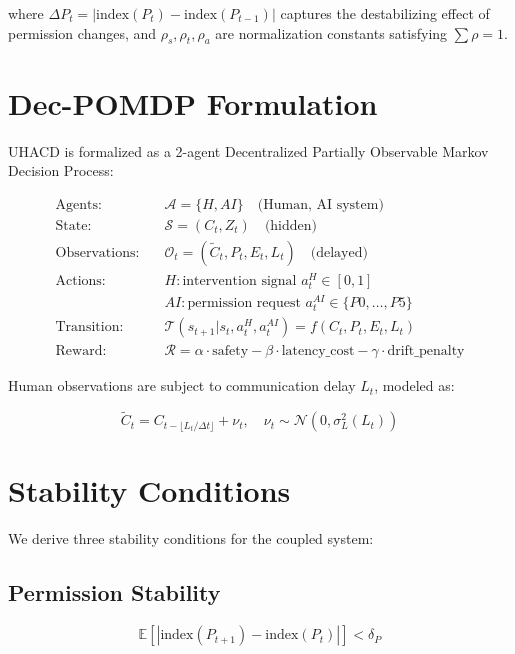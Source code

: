 \documentclass[conference]{IEEEtran}
\begin{document}
where $\Delta P_t = |\text{index}(P_t) - \text{index}(P_{t-1})|$ captures the destabilizing effect of permission changes, and $\rho_s, \rho_t, \rho_a$ are normalization constants satisfying $\sum \rho = 1$.

\section{Dec-POMDP Formulation}

UHACD is formalized as a 2-agent Decentralized Partially Observable Markov Decision Process:

\begin{align}
\text{Agents:} \quad & \mathcal{A} = \{H, AI\} \quad \text{(Human, AI system)} \\
\text{State:} \quad & \mathcal{S} = (C_t, Z_t) \quad \text{(hidden)} \\
\text{Observations:} \quad & \mathcal{O}_t = (\tilde{C}_t, P_t, E_t, L_t) \quad \text{(delayed)} \\
\text{Actions:} \quad & H: \text{intervention signal } a_t^H \in [0,1] \\
& AI: \text{permission request } a_t^{AI} \in \{P0,\dots,P5\} \\
\text{Transition:} \quad & \mathcal{T}(s_{t+1} | s_t, a_t^H, a_t^{AI}) = f(C_t, P_t, E_t, L_t) \\
\text{Reward:} \quad & \mathcal{R} = \alpha \cdot \text{safety} - \beta \cdot \text{latency\_cost} - \gamma \cdot \text{drift\_penalty}
\end{align}

Human observations are subject to communication delay $L_t$, modeled as:

\begin{equation}
\tilde{C}_t = C_{t - \lfloor L_t / \Delta t \rfloor} + \nu_t, \quad \nu_t \sim \mathcal{N}(0, \sigma_L^2(L_t))
\end{equation}

\section{Stability Conditions}

We derive three stability conditions for the coupled system:

\subsection{Permission Stability}

\begin{equation}
\mathbb{E}[|\text{index}(P_{t+1}) - \text{index}(P_t)|] < \delta_P
\end{equation}
\end{document}
